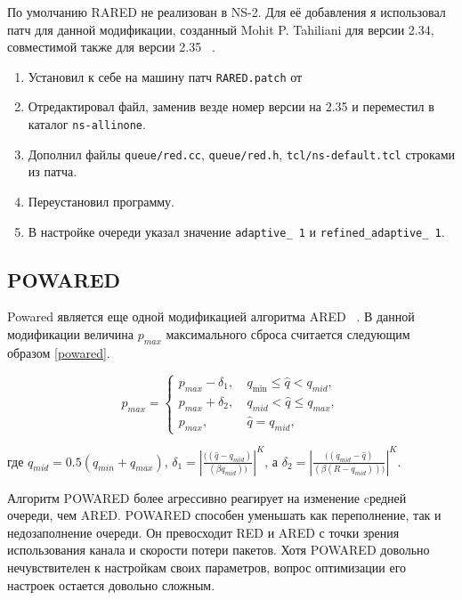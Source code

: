 По умолчанию RARED не реализован в NS-2. Для её добавления я использовал патч для данной модификации, созданный Mohit
  P. Tahiliani для версии 2.34, совместимой также для версии 2.35 ~\cite{refinedpatch}. 

\begin{enumerate}
\item Установил к себе на машину патч \verb|RARED.patch| от 
\item Отредактировал файл, заменив везде номер версии на 2.35 и переместил в каталог \verb|ns-allinone|.
\item Дополнил файлы \verb|queue/red.cc|, \verb|queue/red.h|, \verb|tcl/ns-default.tcl| строками из патча.
\item Переустановил программу.
\item В настройке очереди указал значение \verb|adaptive_ 1| и 
\verb|refined_adaptive_ 1|.
\end{enumerate}
 

\subsection{POWARED}


Powared является еще одной модификацией алгоритма ARED ~\cite{Powared}. 
В данной модификации величина $p_{max}$ максимального сброса считается следующим образом \eqref{powared}. 

\begin{equation}
\label{powared}
p_{max} =\begin{cases}
        p_{max}-\delta_1, &  \  q_{\min} \leqslant \hat{q} < q_{mid}, 
        \\
        p_{max}+\delta_2, & \ q_{mid} < \hat{q}  \leqslant q_{max}, 
        \\
        p_{max}, &  \ \hat{q} =  q_{mid},
\end{cases}
\end{equation}

где $q_{mid} = 0.5(q_{min} + q_{max})$, 
$\delta_1 = |\frac{((\hat{q} - q_{mid})}{(\beta q_{mid}))}|^K $, а $\delta_2 = |\frac{((q_{mid} - \hat{q})}{(\beta (R -q_{mid})))}|^K.$

Алгоритм POWARED более агрессивно реагирует на изменение cредней очереди, чем ARED. POWARED способен уменьшать как переполнение, 
так и недозаполнение очереди. Он превосходит RED и ARED с точки зрения использования канала и скорости потери пакетов. 
Хотя POWARED довольно нечувствителен к настройкам своих параметров, вопрос оптимизации его настроек остается довольно сложным.

